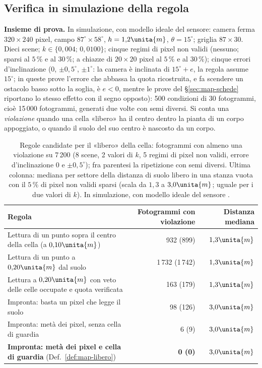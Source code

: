 \subsection{Verifica in simulazione della regola}\label{sec:map-banco}

\textbf{Insieme di prova.} In simulazione, con modello ideale del sensore: camera ferma $320\times240$ pixel, campo $87^\circ\times58^\circ$, $h=1{,}2\unita{m}$, $\theta=15^\circ$; griglia $87\times30$. Dieci scene; $k\in\{0{,}004;\,0{,}0100\}$; cinque regimi di pixel non validi (nessuno; sparsi al $5\,\%$ e al $30\,\%$; a chiazze di $20\times20$ pixel al $5\,\%$ e al $30\,\%$); cinque errori d'inclinazione ($0$, $\pm0{,}5^\circ$, $\pm1^\circ$: la camera è inclinata di $15^\circ+e$, la regola assume $15^\circ$; in queste prove l'errore che abbassa la quota ricostruita, e fa scendere un ostacolo basso sotto la soglia, è $e<0$, mentre le prove del \S\ref{sec:map-schede} riportano lo stesso effetto con il segno opposto): 500 condizioni di 30 fotogrammi, cioè 15\,000 fotogrammi, generati due volte con semi diversi. Si conta una \emph{violazione} quando una cella «libero» ha il centro dentro la pianta di un corpo appoggiato, o quando il suolo del suo centro è nascosto da un corpo.

\begin{table}[t]\centering\small
\caption{Regole candidate per il «libero» della cella: fotogrammi con almeno una violazione su 7\,200 (8 scene, 2 valori di $k$, 5 regimi di pixel non validi, errore d'inclinazione $0$ e $\pm0{,}5^\circ$); fra parentesi la ripetizione con semi diversi. Ultima colonna: mediana per settore della distanza di suolo libero in una stanza vuota con il $5\,\%$ di pixel non validi sparsi (scala da $1{,}3$ a $3{,}0\unita{m}$; uguale per i due valori di $k$). In simulazione, con modello ideale del sensore .}\label{tab:map-regole}
\begin{tabularx}{\linewidth}{Lrr}
\toprule
Regola & Fotogrammi con violazione & Distanza mediana \\
\midrule
Lettura di un punto sopra il centro della cella (a $0{,}10\unita{m}$) & 932 (899) & $1{,}3\unita{m}$\\
Lettura di un punto a $0{,}20\unita{m}$ dal suolo & 1\,732 (1\,742) & $1{,}3\unita{m}$\\
Lettura a $0{,}20\unita{m}$ con veto delle celle occupate e quota verificata & 163 (179) & $1{,}3\unita{m}$\\
Impronta: basta un pixel che legge il suolo & 98 (126) & $3{,}0\unita{m}$\\
Impronta: metà dei pixel, senza cella di guardia & 6 (9) & $3{,}0\unita{m}$\\
\textbf{Impronta: metà dei pixel e cella di guardia} (Def.~\ref{def:map-libero}) & \textbf{0 (0)} & $3{,}0\unita{m}$\\
\bottomrule
\end{tabularx}
\end{table}

